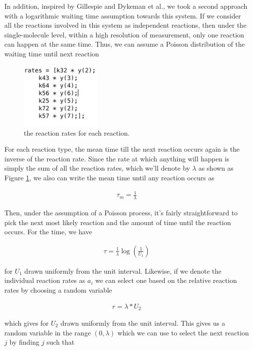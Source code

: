 \documentclass[fleqn,10pt]{wlscirep}
\begin{document}
In addition, inspired by Gillespie \cite{GILLESPIE1976403} and Dykeman et al.\cite{Dykeman18052015}, we took a second approach with a logarithmic waiting time assumption towards this system. If we consider all the reactions involved in this system as independent reactions, then under the single-molecule level, within a high resolution of measurement, only one reaction can happen at the same time. Thus, we can assume a Poisson distribution of the waiting time until next reaction

\begin{figure}[ht]
\centering
\includegraphics[width=4cm]{rate}
\caption{the reaction rates for each reaction.}
\label{fig:rate} 
\end{figure}

For each reaction type, the mean time till the next reaction occurs again is the inverse of the reaction rate.  Since the rate at which anything will happen is simply the sum of all the reaction rates, which we'll denote by $\lambda$ as shown as Figure \ref{fig:rate}, we also can write the mean time until any reaction occurs as   
   
    \begin{align*}
        \tau_m = \frac{1}{\lambda}    
    \end{align*}
    
Then, under the assumption of a Poisson process, it's fairly straightforward to pick the next most likely reaction and the amount of time until the reaction occurs. For the time, we have
    
    \begin{align*}
        \tau = \frac{1}{\lambda}\log(\frac{1}{U_1})
    \end{align*}
    
for $U_1$ drawn uniformly from the unit interval.  Likewise, if we denote the individual reaction rates as $a_i$ we can select one based on the relative reaction rates by choosing a random variable
    
    \begin{align*}
        r = \lambda*U_2
    \end{align*}
    
which gives for $U_2$ drawn uniformly from the unit interval. This gives us a random variable in the range $(0, \lambda)$  which we can use to select the next reaction $j$ by finding $j$ such that
    
\end{document}
